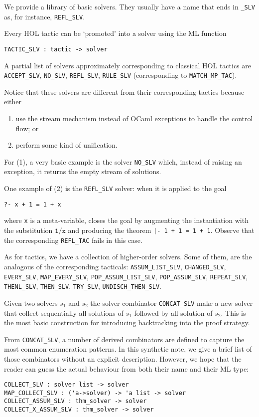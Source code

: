 We provide a library of basic solvers.  They usually have a name that
ends in \verb|_SLV| as, for instance, \verb|REFL_SLV|.

Every HOL tactic can be `promoted' into a solver using the ML function
\begin{verbatim}
TACTIC_SLV : tactic -> solver
\end{verbatim}
A partial list of solvers approximately corresponding to classical HOL
tactics are \verb|ACCEPT_SLV|, \verb|NO_SLV|, \verb|REFL_SLV|,
\verb|RULE_SLV| (corresponding to \verb|MATCH_MP_TAC|).

Notice that these solvers are different from their corresponding
tactics because either
\begin{enumerate}
\item use the stream mechanism instead of OCaml exceptions to
  handle the control flow; or
\item perform some kind of unification.
\end{enumerate}

For (1), a very basic example is the solver \verb|NO_SLV| which,
instead of raising an exception, it returns the empty stream of
solutions.

One example of (2) is the \verb|REFL_SLV| solver: when it is applied
to the goal
\begin{verbatim}
?- x + 1 = 1 + x
\end{verbatim}
where \verb|x| is a meta-variable, closes the goal by augmenting the
instantiation with the substitution $\mathtt{1}/\mathtt{x}$ and
producing the theorem \verb!|- 1 + 1 = 1 + 1!.  Observe that the
corresponding \verb|REFL_TAC| fails in this case.

As for tactics, we have a collection of higher-order solvers.  Some of
them, are the analogous of the corresponding tacticals:
\verb|ASSUM_LIST_SLV|,
\verb|CHANGED_SLV|,
\verb|EVERY_SLV|,
\verb|MAP_EVERY_SLV|,
\verb|POP_ASSUM_LIST_SLV|,
\verb|POP_ASSUM_SLV|,
\verb|REPEAT_SLV|,
\verb|THENL_SLV|,
\verb|THEN_SLV|,
\verb|TRY_SLV|,
\verb|UNDISCH_THEN_SLV|.


Given two solvers $s_1$ and $s_2$ the solver combinator
\verb|CONCAT_SLV| make a new solver that collect sequentially all
solutions of $s_1$ followed by all solution of $s_2$.  This is the
most basic construction for introducing backtracking into the proof
strategy.

From \verb|CONCAT_SLV|, a number of derived combinators are defined to
capture the most common enumeration patterns.  In this synthetic note,
we give a brief list of those combinators without an explicit
description. However, we hope that the reader can guess the actual
behaviour from both their name and their ML type:
\begin{verbatim}
COLLECT_SLV : solver list -> solver
MAP_COLLECT_SLV : ('a->solver) -> 'a list -> solver
COLLECT_ASSUM_SLV : thm_solver -> solver
COLLECT_X_ASSUM_SLV : thm_solver -> solver
\end{verbatim}

